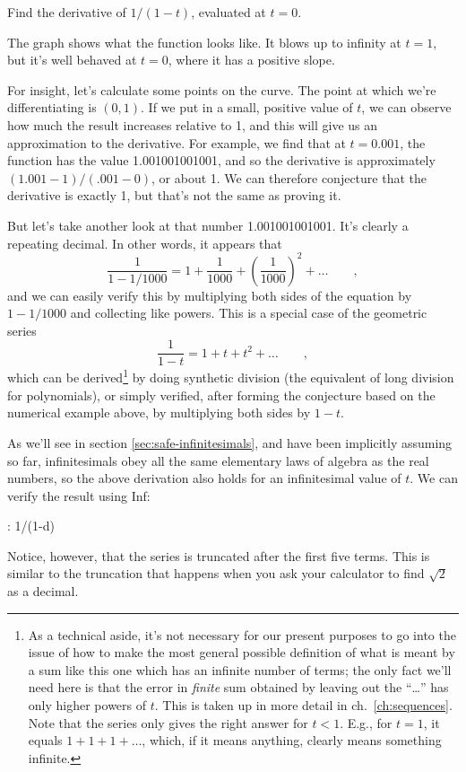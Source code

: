 \begin{eg}\label{eg:geometric-series}
\egquestion
Find the derivative of $1/(1-t)$, evaluated at $t=0$.

\eganswer
The graph shows what the function looks like. It blows up to infinity at $t=1$, but it's well behaved at $t=0$, where it has a
positive slope.

For insight, let's calculate some points on the curve. The point at which we're differentiating is
$(0,1)$. If we put in a small, positive value of $t$, we can observe how much the result increases
relative to 1, and this will give us an approximation to the derivative. For example, we find
that at $t=0.001$, the function has the value 1.001001001001, and so the derivative
is approximately $(1.001-1)/(.001-0)$, or about 1. We can therefore conjecture that the derivative
is exactly 1, but that's not the same as proving it.

But let's take another look at that number 1.001001001001. It's clearly a repeating decimal.
In other words, it appears that
\begin{equation*}
       \frac{1}{1-1/1000} = 1+\frac{1}{1000}+\left(\frac{1}{1000}\right)^2+\ldots \qquad ,
\end{equation*}
and we can easily verify this by multiplying both sides of the equation by $1-1/1000$ and collecting like
powers. This is a special case of the geometric series\label{geometric-series}
\begin{equation*}
       \frac{1}{1-t} = 1+t+t^2+\ldots \qquad ,
\end{equation*}
which can be derived\footnote{As a technical aside, it's not necessary for our present purposes
to go into the issue of how to make the most general possible definition of what is meant by
a sum like this one which has an infinite number of terms; the only fact we'll need here is that
the error in \emph{finite} sum obtained by leaving out the ``\ldots'' has only higher powers of $t$. This
is taken up in more detail in ch.~\ref{ch:sequences}. Note that the series only gives the right answer
for $t<1$. E.g., for $t=1$, it equals $1+1+1+\ldots$, which, if it means anything, clearly means something
infinite.}
by doing synthetic division (the equivalent of long
division for polynomials), or simply verified, after forming the conjecture based on the numerical
example above, by multiplying both sides by $1-t$.

As we'll see in section \ref{sec:safe-infinitesimals}, and have been implicitly assuming so far,
infinitesimals obey all the same elementary laws of algebra as the real numbers,
so the above derivation also holds for an infinitesimal value of $t$.
We can verify the result using Inf:
\begin{Code}
  \ii : 1/(1-d)
\end{Code}
Notice, however, that the series is truncated after the first five terms. This is similar to
the truncation that happens when you ask your calculator to find $\sqrt{2}$ as a decimal.


\end{eg}
